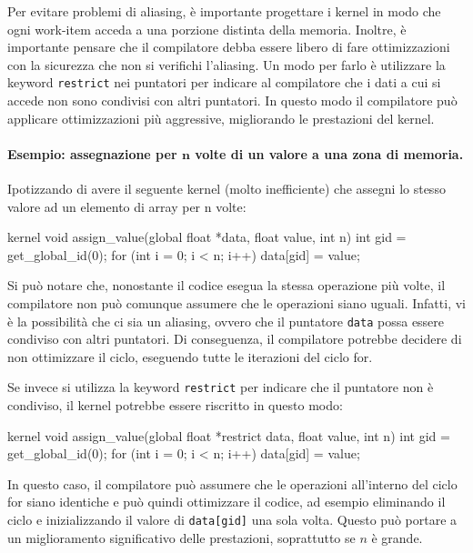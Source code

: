 Per evitare problemi di aliasing, è importante progettare i kernel in modo che ogni work-item acceda a una porzione distinta della memoria. Inoltre, è importante pensare che il compilatore debba essere libero di fare ottimizzazioni con la sicurezza che non si verifichi l'aliasing. Un modo per farlo è utilizzare la keyword \texttt{restrict} nei puntatori per indicare al compilatore che i dati a cui si accede non sono condivisi con altri puntatori. In questo modo il compilatore può applicare ottimizzazioni più aggressive, migliorando le prestazioni del kernel.

\paragraph{Esempio: assegnazione per $\mathbf{n}$ volte di un valore a una zona di memoria.}
Ipotizzando di avere il seguente kernel (molto inefficiente) che assegni lo stesso valore ad un elemento di array per n volte:
\begin{code}[caption={Kernel con potenziale aliasing}, label={code:kernel_aliasing}]
kernel void assign_value(global float *data, float value, int n) {
    int gid = get_global_id(0);
    for (int i = 0; i < n; i++) {
        data[gid] = value;
    }
}
\end{code}

Si può notare che, nonostante il codice esegua la stessa operazione più volte, il compilatore non può comunque assumere che le operazioni siano uguali. Infatti, vi è la possibilità che ci sia un aliasing, ovvero che il puntatore \texttt{data} possa essere condiviso con altri puntatori. Di conseguenza, il compilatore potrebbe decidere di non ottimizzare il ciclo, eseguendo tutte le iterazioni del ciclo for.

Se invece si utilizza la keyword \texttt{restrict} per indicare che il puntatore non è condiviso, il kernel potrebbe essere riscritto in questo modo:
\begin{code}[caption={Kernel con \texttt{restrict} per evitare aliasing}, label={code:kernel_no_aliasing}]
kernel void assign_value(global float *restrict data, float value, int n) {
    int gid = get_global_id(0);
    for (int i = 0; i < n; i++) {
        data[gid] = value;
    }
}
\end{code}
In questo caso, il compilatore può assumere che le operazioni all'interno del ciclo for siano identiche e può quindi ottimizzare il codice, ad esempio eliminando il ciclo e inizializzando il valore di \texttt{data[gid]} una sola volta. Questo può portare a un miglioramento significativo delle prestazioni, soprattutto se $n$ è grande.


